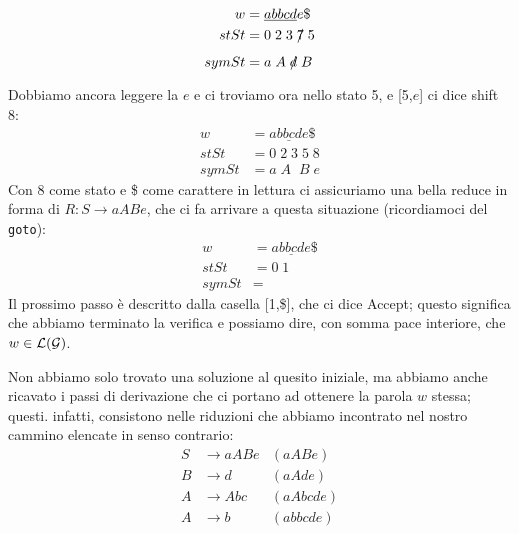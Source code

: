 \documentclass[class=book, crop=false, oneside, 12pt]{standalone}
\begin{document}
\begin{align*}
    w &= \underline{abbcd}e\$ \\
    stSt &= 0\;2\;3\;\xout{7}\;5\\
    symSt &= a\;A\;\xout{d}\;B
\end{align*}
Dobbiamo ancora leggere la \(e\) e ci troviamo ora nello stato 5, e [5,\(e\)] ci dice shift 8:
\begin{align*}
    w &= \underline{abbcde}\$ \\
    stSt &= 0\;2\;3\;5\;8\\
    symSt &= a\;A\;\;B\;e
\end{align*}
Con 8 come stato e \$ come carattere in lettura ci assicuriamo una bella reduce in forma di \(R: S \to aABe\), che ci fa arrivare a questa situazione (ricordiamoci del \texttt{goto}):
\begin{align*}
    w &= \underline{abbcde}\$ \\
    stSt &= 0\;1\\
    symSt &= 
\end{align*}
Il prossimo passo è descritto dalla casella [1,\$], che ci dice Accept; questo significa che abbiamo terminato la verifica e possiamo dire, con somma pace interiore, che \(w \in \mathcal{L}(\mathcal{G})\).

Non abbiamo solo trovato una soluzione al quesito iniziale, ma abbiamo anche ricavato i passi di derivazione che ci portano ad ottenere la parola \(w\) stessa; questi. infatti, consistono nelle riduzioni che abbiamo incontrato nel nostro cammino elencate in senso contrario:
\begin{align*}
    S &\to aABe &(aABe)\\
    B &\to d &(aAde)\\
    A &\to Abc &(aAbcde)\\
    A &\to b &(abbcde)
\end{align*}
\end{document}
